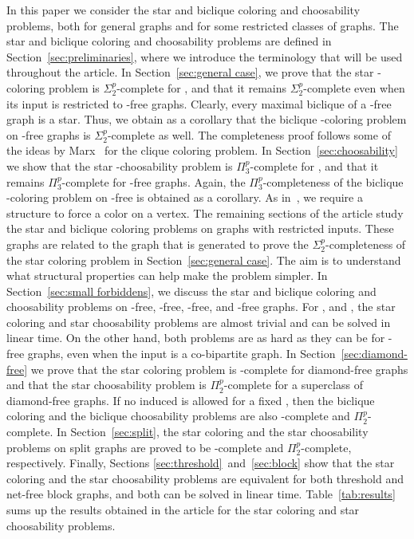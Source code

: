 \documentclass[a4paper, 11pt, oneside]{article}
\newcommand{\ptwop}{\ensuremath{\Pi^p_2}\xspace}
\newcommand{\stp}{\ensuremath{\Sigma^p_2}\xspace}
\newcommand{\ptp}{\ensuremath{\Pi^p_3}\xspace}
\begin{document}
In this paper we consider the star and biclique coloring and choosability problems, both for general graphs and for some restricted classes of graphs.  The star and biclique coloring and choosability problems are defined in Section~\ref{sec:preliminaries}, where we introduce the terminology that will be used throughout the article.  In Section~\ref{sec:general case}, we prove that the star -coloring problem is \stp-complete for , and that it remains \stp-complete even when its input is restricted to -free graphs.  Clearly, every maximal biclique of a -free graph is a star.  Thus, we obtain as a corollary that the biclique -coloring problem on -free graphs is \stp-complete as well.  The completeness proof follows some of the ideas by Marx~\cite{MarxTCS2011} for the clique coloring problem.  In Section~\ref{sec:choosability} we show that the star -choosability problem is \ptp-complete for , and that it remains \ptp-complete for -free graphs.  Again, the \ptp-completeness of the biclique -coloring problem on -free is obtained as a corollary.  As in~\cite{MarxTCS2011}, we require a structure to force a color on a vertex.  The remaining sections of the article study the star and biclique coloring problems on graphs with restricted inputs.  These graphs are related to the graph  that is generated to prove the \stp-completeness of the star coloring problem in Section~\ref{sec:general case}.  The aim is to understand what structural properties can help make the problem simpler.  In Section~\ref{sec:small forbiddens}, we discuss the star and biclique coloring and choosability problems on -free, -free, -free, and -free graphs.  For ,  and , the star coloring and star choosability problems are almost trivial and can be solved in linear time.  On the other hand, both problems are as hard as they can be for -free graphs, even when the input is a co-bipartite graph.  In Section~\ref{sec:diamond-free} we prove that the star coloring problem is \NP-complete for diamond-free graphs and that the star choosability problem is \ptwop-complete for a superclass of diamond-free graphs.  If no induced  is allowed for a fixed , then the biclique coloring and the biclique choosability problems are also \NP-complete and \ptwop-complete.  In Section~\ref{sec:split}, the star coloring and the star choosability problems on split graphs are proved to be \NP-complete and \ptwop-complete, respectively.  Finally, Sections \ref{sec:threshold}~and~\ref{sec:block} show that the star coloring and the star choosability problems are equivalent for both threshold and net-free block graphs, and both can be solved in linear time.  Table~\ref{tab:results} sums up the results obtained in the article for the star coloring and star choosability problems.
\end{document}
